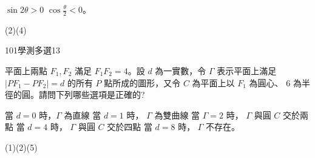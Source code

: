 \begin{QUESTIONS}
\begin{QUESTION}
\begin{QBODY}
\begin{QOPS}
				\QOP $\sin 2\theta >0$ 
				\QOP $\cos \frac{\theta}{2} <0$。
			\end{QOPS}
        \end{QBODY}
        \begin{QFROMS}
        \end{QFROMS}
        \begin{QTAGS}\end{QTAGS}
        \begin{QANS}
            (2)(4)
        \end{QANS}
        \begin{QSOLLIST}
        \end{QSOLLIST}
        \begin{QEMPTYSPACE}
        \end{QEMPTYSPACE}
    \end{QUESTION}
    \begin{QUESTION}
        \begin{ExamInfo}{101}{學測}{多選}{13}
        \end{ExamInfo}
        \begin{ExamAnsRateInfo}{45}{79}{40}{16}
        \end{ExamAnsRateInfo}
        \begin{QBODY}
			平面上兩點 $F_1,F_2$ 滿足 $F_1F_2 =4$。設 $d$ 為一實數，令 $\Gamma$ 表示平面上滿足 $|PF_1 -PF_2|=d$ 的所有 $P$ 點所成的圖形，又令 $C$ 為平面上以 $F_1$ 為圓心、 6 為半徑的圓。請問下列哪些選項是正確的?
			\begin{QOPS}
				\QOP 當 $d = 0$ 時，$\Gamma$ 為直線 
				\QOP 當 $d =1$ 時， $\Gamma$ 為雙曲線 
				\QOP 當 $\Gamma = 2$ 時， $\Gamma$ 與圓 $C$ 交於兩點 
				\QOP 當 $d = 4$ 時， $\Gamma$ 與圓 $C$ 交於四點 
				\QOP 當 $d = 8$ 時， $\Gamma$ 不存在。
			\end{QOPS}
        \end{QBODY}
        \begin{QFROMS}
        \end{QFROMS}
        \begin{QTAGS}\end{QTAGS}
        \begin{QANS}
            (1)(2)(5)
        \end{QANS}
        \begin{QSOLLIST}
        \end{QSOLLIST}
        \begin{QEMPTYSPACE}
        \end{QEMPTYSPACE}
    \end{QUESTION}
\end{QUESTIONS}
